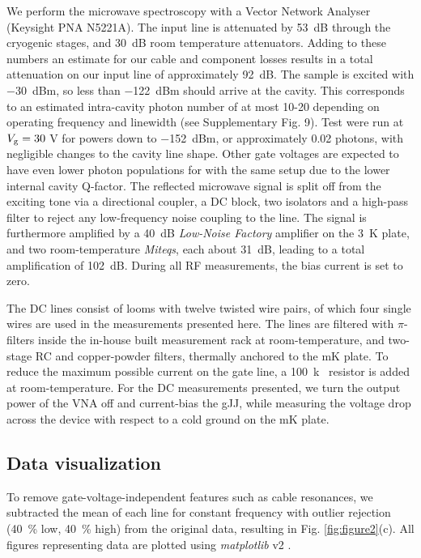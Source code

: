 \documentclass[preprint,
  onecolumn,
  notitlepage,
  amsmath,amssymb,
  aip,
  apl,
]{revtex4-1}
\begin{document}
We perform the microwave spectroscopy with a Vector Network Analyser (Keysight PNA N5221A).
The input line is attenuated by \SI{53}{dB} through the cryogenic stages, and \SI{30}{dB} room temperature attenuators.
Adding to these numbers an estimate for our cable and component losses results in a total attenuation on our input line of approximately \SI{92}{dB}.
The sample is excited with \SI{-30}{dBm}, so less than \SI{-122}{dBm} should arrive at the cavity.
This corresponds to an estimated intra-cavity photon number of at most 10-20 depending on operating frequency and linewidth (see Supplementary Fig. 9).
Test were run at $V_{\rm g} = 30$ V for powers down to \SI{-152}{dBm}, or approximately 0.02 photons, with negligible changes to the cavity line shape.
Other gate voltages are expected to have even lower photon populations for with the same setup due to the lower internal cavity Q-factor.
The reflected microwave signal is split off from the exciting tone via a directional coupler, a DC block, two isolators and a high-pass filter to reject any low-frequency noise coupling to the line.
The signal is furthermore amplified by a \SI{40}{dB} \textit{Low-Noise Factory} amplifier on the \SI{3}{K} plate, and two room-temperature \textit{Miteqs}, each about \SI{31}{dB}, leading to a total amplification of \SI{102}{dB}.
During all RF measurements, the bias current is set to zero.

The DC lines consist of looms with twelve twisted wire pairs, of which four single wires are used in the measurements presented here.
The lines are filtered with $\pi$-filters inside the in-house built measurement rack at room-temperature, and two-stage RC and copper-powder filters, thermally anchored to the mK plate.
To reduce the maximum possible current on the gate line, a \SI{100}{k\Omega} resistor is added at room-temperature.
For the DC measurements presented, we turn the output power of the VNA off and current-bias the gJJ, while measuring the voltage drop across the device with respect to a cold ground on the mK plate.

\subsection*{Data visualization}
To remove gate-voltage-independent features such as cable resonances, we subtracted the mean of each line for constant frequency with outlier rejection (\SI{40}{\percent} low, \SI{40}{\percent} high) from the original data, resulting in Fig. \ref{fig:figure2}(c).
All figures representing data are plotted using \textit{matplotlib} v2 \cite{hunter_matplotlib_2007}.
\end{document}
